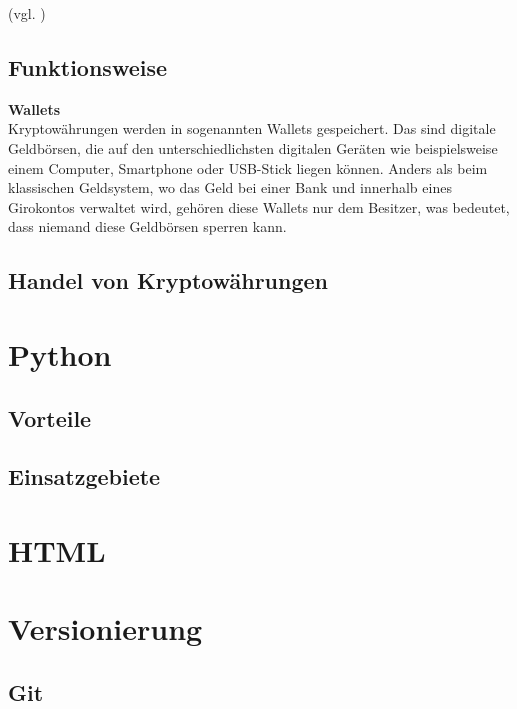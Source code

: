 \documentclass[oneside]{ausarbeitung}
\begin{document}
(vgl. \cite{cryptocurrency_explained})

\subsection{Funktionsweise}
\label{sub:funktionsweise}

\textbf{Wallets} \\
Kryptowährungen werden in sogenannten Wallets gespeichert. Das sind digitale Geldbörsen, die auf den unterschiedlichsten digitalen Geräten wie beispielsweise einem Computer, Smartphone oder USB-Stick liegen können. Anders als beim klassischen Geldsystem, wo das Geld bei einer Bank und innerhalb eines Girokontos verwaltet wird, gehören diese Wallets nur dem Besitzer, was bedeutet, dass niemand diese Geldbörsen sperren kann. 

\subsection{Handel von Kryptowährungen}
\label{sub:handel_von_kryptowährungen}


\section{Python}
\label{sec:python}

\subsection{Vorteile}
\label{sub:vorteile}

\subsection{Einsatzgebiete}
\label{sub:einsatzgebiete}


\section{HTML}
\label{sec:html}


\section{Versionierung}
\label{sec:versionierung}

\subsection{Git}
\label{sub:git}
\end{document}
